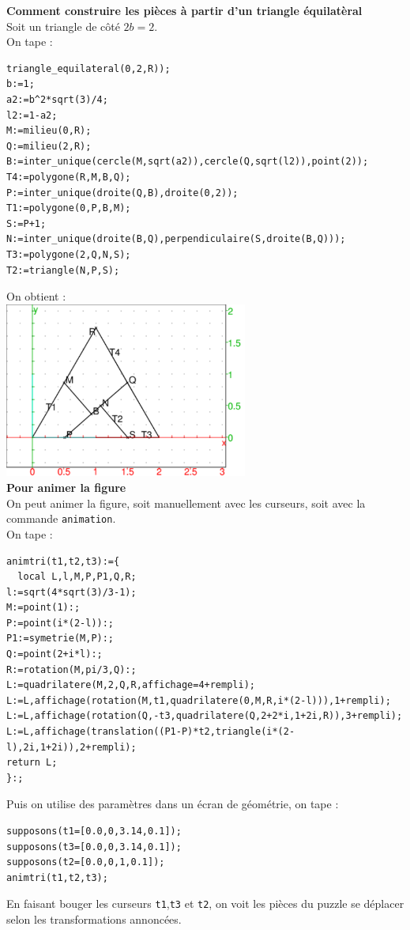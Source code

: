 \documentclass[a4paper,11pt]{book}
\begin{document}
{\bf Comment construire les pi\`eces \`a partir d'un triangle \'equilat\`eral}\\
Soit un triangle de c\^ot\'e $2b=2$.\\
On tape :\\
\begin{verbatim}
triangle_equilateral(0,2,R));
b:=1;
a2:=b^2*sqrt(3)/4;
l2:=1-a2;
M:=milieu(0,R);
Q:=milieu(2,R);
B:=inter_unique(cercle(M,sqrt(a2)),cercle(Q,sqrt(l2)),point(2));
T4:=polygone(R,M,B,Q);
P:=inter_unique(droite(Q,B),droite(0,2));
T1:=polygone(0,P,B,M);
S:=P+1;
N:=inter_unique(droite(B,Q),perpendiculaire(S,droite(B,Q)));
T3:=polygone(2,Q,N,S);
T2:=triangle(N,P,S);
\end{verbatim}
On obtient :\\
\includegraphics[width=8cm]{puzzlecan0}\\
{\bf Pour animer la figure}\\
On peut animer la figure, soit manuellement avec les curseurs, soit avec la 
commande {\tt animation}.\\
On tape :
\begin{verbatim}
animtri(t1,t2,t3):={
  local L,l,M,P,P1,Q,R;
l:=sqrt(4*sqrt(3)/3-1);
M:=point(1):;
P:=point(i*(2-l)):;
P1:=symetrie(M,P):;
Q:=point(2+i*l):;
R:=rotation(M,pi/3,Q):;
L:=quadrilatere(M,2,Q,R,affichage=4+rempli); 
L:=L,affichage(rotation(M,t1,quadrilatere(0,M,R,i*(2-l))),1+rempli); 
L:=L,affichage(rotation(Q,-t3,quadrilatere(Q,2+2*i,1+2i,R)),3+rempli); 
L:=L,affichage(translation((P1-P)*t2,triangle(i*(2-l),2i,1+2i)),2+rempli);
return L;
}:;
\end{verbatim}
Puis on utilise des param\`etres dans un \'ecran de g\'eom\'etrie, on tape :
\begin{verbatim}
supposons(t1=[0.0,0,3.14,0.1]);
supposons(t3=[0.0,0,3.14,0.1]);
supposons(t2=[0.0,0,1,0.1]);
animtri(t1,t2,t3);
\end{verbatim}
En faisant bouger les curseurs {\tt t1},{\tt t3} et {\tt t2}, on voit les 
pi\`eces du puzzle se d\'eplacer selon les transformations annonc\'ees.\\
\end{document}
